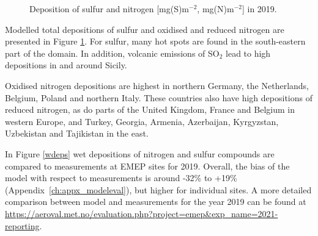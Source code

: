 \begin{figure}[H]
 \caption{Deposition of sulfur and nitrogen [mg(S)m$^{-2}$, mg(N)m$^{-2}$] in 2019.}
\label{deps}
\end{figure}

Modelled total depositions of sulfur and oxidised and reduced nitrogen are presented in Figure \ref{deps}.
For sulfur, many hot spots are found in the south-eastern part of the domain. In addition, volcanic emissions of SO$_2$ lead to high depositions in and around Sicily.

Oxidised nitrogen depositions are highest in northern Germany, the Netherlands, Belgium, Poland and northern Italy. These countries also have high depositions of reduced nitrogen, as do parts of the United Kingdom, France and Belgium in western Europe, and Turkey, Georgia, Armenia, Azerbaijan, Kyrgyzstan, Uzbekistan and Tajikistan in the east. 

In Figure \ref{wdeps} wet depositions of nitrogen and sulfur compounds are compared to measurements at EMEP sites for 2019. Overall, the bias of the model with respect to measurements is around 
-32\% to +19\% (Appendix~\ref{ch:appx_modeleval}), but higher for individual sites. A more detailed comparison between model and measurements for the year 2019 can be found at \url{https://aeroval.met.no/evaluation.php?project=emep&exp_name=2021-reporting}.

